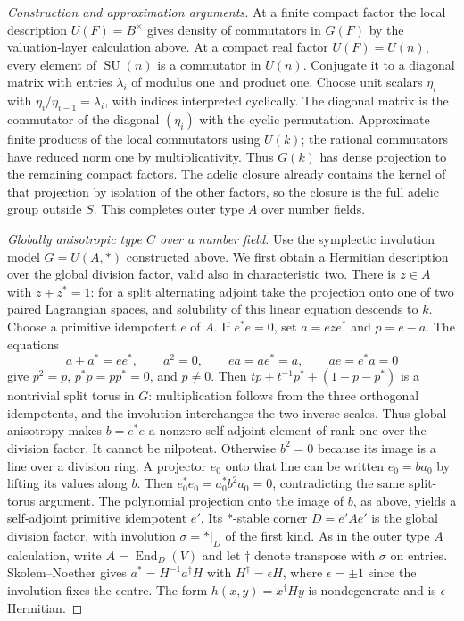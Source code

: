\documentclass[11pt,a4paper,openany,oneside]{book}
\theoremstyle{resultstyle}
\theoremstyle{definition}
\numberwithin{equation}{chapter}
\begin{document}
\begin{proof}[Construction and approximation arguments]
At a finite compact factor the local description
\(U(F)=B^\times\) gives density of commutators in
\(G(F)\) by the valuation-layer calculation above.
At a compact real factor \(U(F)=U(n)\), every
element of \(\operatorname{SU}(n)\) is a commutator
in \(U(n)\). Conjugate it to a diagonal matrix
with entries \(\lambda_i\) of modulus one and
product one. Choose unit scalars \(\eta_i\) with
\(\eta_i/\eta_{i-1}=\lambda_i\), with indices
interpreted cyclically. The diagonal matrix is the
commutator of the diagonal \((\eta_i)\) with the
cyclic permutation. Approximate finite products of
the local commutators using \(U(k)\); the rational
commutators have reduced norm one by multiplicativity.
Thus \(G(k)\) has dense projection to the remaining
compact factors. The adelic closure already contains
the kernel of that projection by isolation of the other
factors, so the closure is the full adelic group
outside \(S\). This completes outer type \(A\)
over number fields.

\medskip\noindent
\textit{Globally anisotropic type \(C\) over a number field.}
Use the symplectic involution model \(G=U(A,\ast)\)
constructed above. We first obtain a Hermitian
description over the global division factor, valid
also in characteristic two. There is \(z\in A\) with
\(z+z^\ast=1\): for a split alternating adjoint take
the projection onto one of two paired Lagrangian
spaces, and solubility of this linear equation
descends to \(k\). Choose a primitive idempotent
\(e\) of \(A\). If \(e^\ast e=0\), set \(a=eze^\ast\)
and \(p=e-a\). The equations
\[
 a+a^\ast=ee^\ast,\qquad a^2=0,\qquad ea=ae^\ast=a,
 \qquad ae=e^\ast a=0
\]
give \(p^2=p\), \(p^\ast p=pp^\ast=0\), and
\(p\ne0\). Then
\(t p+t^{-1}p^\ast+(1-p-p^\ast)\) is a nontrivial
split torus in \(G\): multiplication follows from
the three orthogonal idempotents, and the involution
interchanges the two inverse scales. Thus global
anisotropy makes \(b=e^\ast e\) a nonzero self-adjoint
element of rank one over the division factor. It cannot
be nilpotent. Otherwise \(b^2=0\) because its image is a
line over a division ring. A projector \(e_0\) onto
that line can be written \(e_0=ba_0\) by lifting its
values along \(b\). Then \(e_0^\ast e_0=a_0^\ast b^2a_0=0\),
contradicting the same split-torus argument. The polynomial
projection onto the image of \(b\), as above, yields a
self-adjoint primitive
idempotent \(e'\). Its \(\ast\)-stable corner
\(D=e'Ae'\) is the global division factor, with
involution \(\sigma=\ast|_D\) of the first kind.
As in the outer type \(A\) calculation, write
\(A=\operatorname{End}_D(V)\) and let \(\dagger\)
denote transpose with \(\sigma\) on entries.
Skolem--Noether gives \(a^\ast=H^{-1}a^\dagger H\)
with \(H^\dagger=\epsilon H\), where \(\epsilon=\pm1\)
since the involution fixes the centre. The form
\(h(x,y)=x^\dagger H y\) is nondegenerate and is
\(\epsilon\)-Hermitian.


\end{proof}
\end{document}
